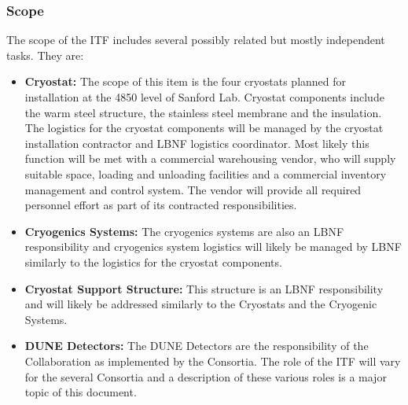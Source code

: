 \subsubsection{Scope}
The scope of the ITF includes several possibly related but mostly
independent tasks. They are:
\begin{itemize}
\item{\bf Cryostat:} The scope of this item is the four cryostats
  planned for installation at the 4850 level of Sanford Lab. Cryostat
  components include the warm steel structure, the stainless steel membrane and
  the insulation. The logistics for the cryostat components will be
  managed by the cryostat installation contractor and LBNF logistics
  coordinator.  Most likely this function will be met with a
  commercial warehousing vendor, who will supply suitable space,
  loading and unloading facilities and a commercial inventory
  management and control system. The vendor will provide all required
  personnel effort as part of its contracted responsibilities.
\item{\bf Cryogenics Systems:} The cryogenics systems are also an LBNF
  responsibility and cryogenics system logistics will likely be
  managed by LBNF similarly to the logistics for the cryostat
  components.
\item{\bf Cryostat Support Structure:} This structure is an LBNF
  responsibility and will likely be addressed similarly to the
  Cryostats and the Cryogenic Systems.
\item{\bf DUNE Detectors:} The DUNE Detectors are the responsibility
  of the Collaboration as implemented by the Consortia. The role of
  the ITF will vary for the several Consortia and a description of
  these various roles is a major topic of this document.
\end{itemize}

